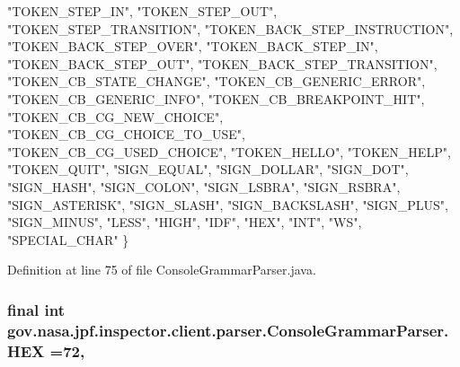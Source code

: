 \begin{DoxyCode}
    \textcolor{stringliteral}{"TOKEN\_STEP\_IN"}, \textcolor{stringliteral}{"TOKEN\_STEP\_OUT"}, \textcolor{stringliteral}{"TOKEN\_STEP\_TRANSITION"}, \textcolor{stringliteral}{"TOKEN\_BACK\_STEP\_INSTRUCTION"}, 
    \textcolor{stringliteral}{"TOKEN\_BACK\_STEP\_OVER"}, \textcolor{stringliteral}{"TOKEN\_BACK\_STEP\_IN"}, \textcolor{stringliteral}{"TOKEN\_BACK\_STEP\_OUT"}, \textcolor{stringliteral}{"TOKEN\_BACK\_STEP\_TRANSITION"}, 
    \textcolor{stringliteral}{"TOKEN\_CB\_STATE\_CHANGE"}, \textcolor{stringliteral}{"TOKEN\_CB\_GENERIC\_ERROR"}, \textcolor{stringliteral}{"TOKEN\_CB\_GENERIC\_INFO"}, 
    \textcolor{stringliteral}{"TOKEN\_CB\_BREAKPOINT\_HIT"}, \textcolor{stringliteral}{"TOKEN\_CB\_CG\_NEW\_CHOICE"}, \textcolor{stringliteral}{"TOKEN\_CB\_CG\_CHOICE\_TO\_USE"}, 
    \textcolor{stringliteral}{"TOKEN\_CB\_CG\_USED\_CHOICE"}, \textcolor{stringliteral}{"TOKEN\_HELLO"}, \textcolor{stringliteral}{"TOKEN\_HELP"}, \textcolor{stringliteral}{"TOKEN\_QUIT"}, 
    \textcolor{stringliteral}{"SIGN\_EQUAL"}, \textcolor{stringliteral}{"SIGN\_DOLLAR"}, \textcolor{stringliteral}{"SIGN\_DOT"}, \textcolor{stringliteral}{"SIGN\_HASH"}, \textcolor{stringliteral}{"SIGN\_COLON"}, \textcolor{stringliteral}{"SIGN\_LSBRA"}, 
    \textcolor{stringliteral}{"SIGN\_RSBRA"}, \textcolor{stringliteral}{"SIGN\_ASTERISK"}, \textcolor{stringliteral}{"SIGN\_SLASH"}, \textcolor{stringliteral}{"SIGN\_BACKSLASH"}, \textcolor{stringliteral}{"SIGN\_PLUS"}, 
    \textcolor{stringliteral}{"SIGN\_MINUS"}, \textcolor{stringliteral}{"LESS"}, \textcolor{stringliteral}{"HIGH"}, \textcolor{stringliteral}{"IDF"}, \textcolor{stringliteral}{"HEX"}, \textcolor{stringliteral}{"INT"}, \textcolor{stringliteral}{"WS"}, \textcolor{stringliteral}{"SPECIAL\_CHAR"}
  \}
\end{DoxyCode}


Definition at line 75 of file Console\+Grammar\+Parser.\+java.

\subsubsection[{\texorpdfstring{H\+EX}{HEX}}]{\setlength{\rightskip}{0pt plus 5cm}final int gov.\+nasa.\+jpf.\+inspector.\+client.\+parser.\+Console\+Grammar\+Parser.\+H\+EX =72\hspace{0.3cm}{\ttfamily [static]}, {\ttfamily [package]}}\hypertarget{classgov_1_1nasa_1_1jpf_1_1inspector_1_1client_1_1parser_1_1_console_grammar_parser_a760e1cd3b643e8ee8af5d134b5d438c6}{}\label{classgov_1_1nasa_1_1jpf_1_1inspector_1_1client_1_1parser_1_1_console_grammar_parser_a760e1cd3b643e8ee8af5d134b5d438c6}


